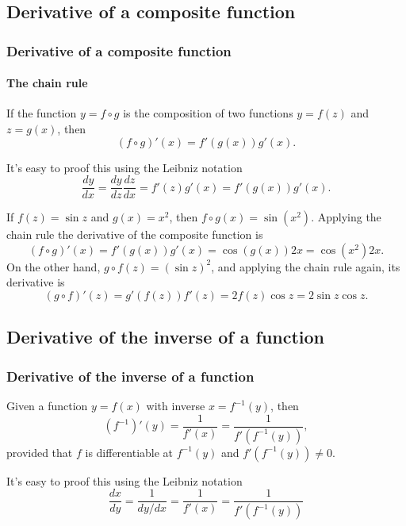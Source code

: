 \subsection{Derivative of a composite function}

\begin{frame}
\frametitle{Derivative of a composite function}
\framesubtitle{The chain rule}
\begin{theorem} If the function $y=f\circ g$ is the composition of two functions $y=f(z)$ and $z=g(x)$, then
\[
(f\circ g)'(x)=f'(g(x))g'(x).
\]
\end{theorem}

It's easy to proof this using the Leibniz notation
\[
\frac{dy}{dx}=\frac{dy}{dz}\frac{dz}{dx}=f'(z)g'(x)=f'(g(x))g'(x).
\]

 If $f(z)=\sin z$ and $g(x)=x^2$, then $f\circ g(x)=\sin(x^2)$. Applying the chain rule the derivative of the composite function is
\[
(f\circ g)'(x)=f'(g(x))g'(x) = \cos(g(x)) 2x = \cos(x^2)2x.
\]
On the other hand, $g\circ f(z)= (\sin z)^2$, and applying the chain rule again, its derivative is
\[
(g\circ f)'(z)=g'(f(z))f'(z) = 2f(z)\cos z = 2\sin z\cos z.
\]
\end{frame}



\subsection{Derivative of the inverse of a function}
\begin{frame}
\frametitle{Derivative of the inverse of a function}
\begin{theorem}
Given a function $y=f(x)$ with inverse $x=f^{-1}(y)$, then 
\[
\left(f^{-1}\right)'(y)=\frac{1}{f'(x)}=\frac{1}{f'(f^{-1}(y))},
\]
provided that $f$ is differentiable at $f^{-1}(y)$ and $f'(f^{-1}(y))\neq 0$.
\end{theorem}

It's easy to proof this using the Leibniz notation
\[
\frac{dx}{dy}=\frac{1}{dy/dx}=\frac{1}{f'(x)}=\frac{1}{f'(f^{-1}(y))}
\]
\end{frame}



